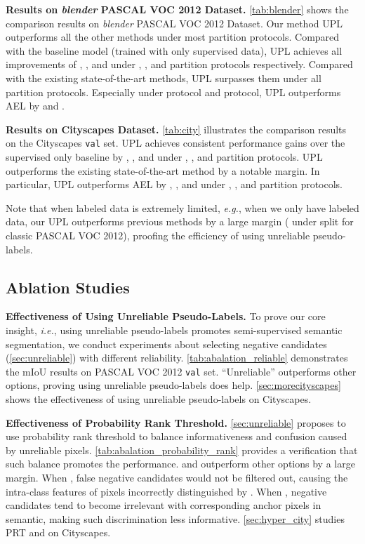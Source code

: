 \documentclass[10pt, twocolumn, letterpaper]{article}
\begin{document}
\noindent\textbf{Results on \textit{blender} PASCAL VOC 2012 Dataset.} \cref{tab:blender} shows the comparison results on \textit{blender} PASCAL VOC 2012 Dataset. 
Our method UPL outperforms all the other methods under most partition protocols. 
Compared with the baseline model (trained with only supervised data),  UPL achieves all improvements of , ,  and  under , ,  and  partition protocols respectively.
Compared with the existing state-of-the-art methods, UPL surpasses them under all partition protocols.
Especially under  protocol and  protocol, UPL outperforms AEL by  and .





\noindent\textbf{Results on Cityscapes Dataset.} \cref{tab:city} illustrates the comparison results on the Cityscapes \texttt{val} set. 
UPL achieves consistent performance gains over the supervised only baseline by , ,  and  under , ,  and  partition protocols. 
UPL outperforms the existing state-of-the-art method by a notable margin.
In particular, UPL outperforms AEL by , ,  and  under , ,  and  partition protocols.

Note that when labeled data is extremely limited, \textit{e.g.}, when we only have  labeled data, our UPL outperforms previous methods by a large margin ( under  split for classic PASCAL VOC 2012),
proofing the efficiency of using unreliable pseudo-labels.

\subsection{Ablation Studies}


\noindent \textbf{Effectiveness of Using Unreliable Pseudo-Labels.} To prove our core insight, \textit{i.e.}, using unreliable pseudo-labels promotes semi-supervised semantic segmentation,
we conduct experiments about selecting negative candidates (\cref{sec:unreliable}) with different reliability.
\cref{tab:abalation_reliable} demonstrates the mIoU results on PASCAL VOC 2012 \texttt{val} set.
``Unreliable'' outperforms other options, proving using unreliable pseudo-labels does help.
\cref{sec:morecityscapes} shows the effectiveness of using unreliable pseudo-labels on Cityscapes.


\noindent \textbf{Effectiveness of Probability Rank Threshold.} \cref{sec:unreliable} proposes to use probability rank threshold to balance informativeness and confusion caused by unreliable pixels.
\cref{tab:abalation_probability_rank} provides a verification that such balance promotes the performance.
 and  outperform other options by a large margin.
When  , false negative candidates would not be filtered out, causing the intra-class features of pixels incorrectly distinguished by . 
When  , negative candidates tend to become irrelevant with corresponding anchor pixels in semantic, making such discrimination less informative.
\cref{sec:hyper_city} studies PRT and  on Cityscapes.
\end{document}
